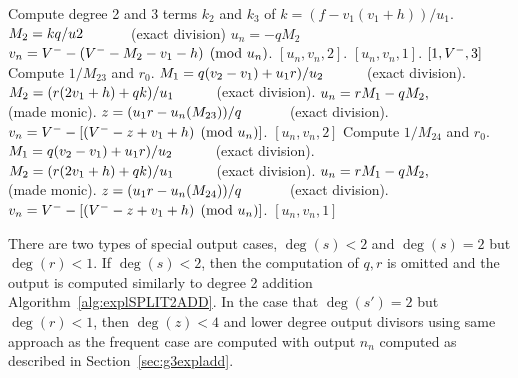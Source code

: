 \begin{subroutine}
\caption{Genus 3 Split Model Degree 3 Addition $r_1 = 0$ \label{sub:g3explSPLIT3ADDr1}}
\begin{algorithmic} [1]
\State Compute degree 2 and 3 terms $k_2$ and $k_3$ of $k = (f - v_1(v_1 +h))/u_1$.
    \State $M_2 = kq/u2 \quad\quad\quad$ (exact division)
    \State $u_n = -qM_2$
    \State $v_n = V^{-} - (V^{-} - M_2 -v_1 - h) \pmod{u_n}$.
     \hspace{3pt} \Return $[u_n,v_n,2]$.
    \Else \hspace{55pt} \Return $[u_n,v_n,1]$.
    \EndIf
\Else
         \Return $[1,V^{-},3]$
        \Else
            \State Compute $1/M_{23}$ and $r_0$.
            \State $M_1 = q(v_2 - v_1) + u_1r)/u_2 \quad\quad\quad $(exact division).
            \State $M_2 = (r(2v_1 + h) + qk)/u_1 \quad\quad\quad $(exact division).
            \State $u_n = rM_1 - qM_2, \quad\quad\quad $ (made monic).
            \State $z = (u_1r - u_n(M_{23}))/q \quad\quad\quad$ (exact division).
            \State $v_n = V^{-} - [(V^{-} - z + v_1 + h) \pmod{u_n}]$.
            \State \Return $[u_n,v_n,2]$
        \EndIf
    \EndIf
    \State Compute $1/M_{24}$ and $r_0$.
    \State $M_1 = q(v_2 - v_1) + u_1r)/u_2 \quad\quad\quad $(exact division).
    \State $M_2 = (r(2v_1 + h) + qk)/u_1 \quad\quad\quad $(exact division).
    \State $u_n = rM_1 - qM_2, \quad\quad\quad $ (made monic).
    \State $z = (u_1r - u_n(M_{24}))/q \quad\quad\quad$ (exact division).
    \State $v_n = V^{-} - [(V^{-} - z + v_1 + h) \pmod{u_n}]$.
    \State \Return $[u_n,v_n,1]$
\EndIf
\end{algorithmic}
\end{subroutine}
There are two types of special output cases, $\deg(s) < 2$ and $\deg(s) = 2$ but
$\deg(r) < 1$. If $\deg(s) < 2$, then the computation of $q,r$ is omitted and
the output is computed similarly to degree 2 addition
Algorithm~\ref{alg:explSPLIT2ADD}.  In the case that $\deg(s') = 2$ but $\deg(r)
< 1$, then $\deg(z) < 4$ and lower degree output divisors using same approach as
the frequent case are computed with output $n_n$ computed as described in
Section~\ref{sec:g3expladd}. 


